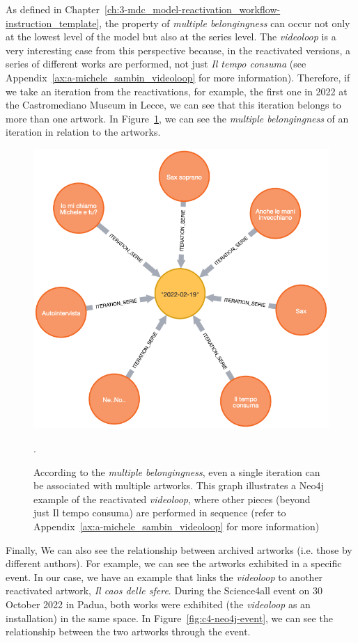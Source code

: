 As defined in Chapter~\ref{ch:3-mdc_model-reactivation_workflow-instruction_template}, the property of \textit{multiple belongingness} can occur not only at the lowest level of the model but also at the series level. The \textit{videoloop} is a very interesting case from this perspective because, in the reactivated versions, a series of different works are performed, not just \textit{Il tempo consuma} (see Appendix~\ref{ax:a-michele_sambin_videoloop} for more information). Therefore, if we take an iteration from the reactivations, for example, the first one in 2022 at the Castromediano Museum in Lecce, we can see that this iteration belongs to more than one artwork. In Figure~\ref{fig:c4-neo4j-multipleartworks}, we can see the \textit{multiple belongingness} of an iteration in relation to the artworks.

\begin{figure}[!h]
    \centering
    \includegraphics[width=0.75\linewidth]{chapters/4-MDC_model_application/image/neo4j-multipleartwork.png}
    \caption{According to the \textit{multiple belongingness}, even a single iteration can be associated with multiple artworks. This graph illustrates a Neo4j example of the reactivated \textit{videoloop}, where other pieces (beyond just Il tempo consuma) are performed in sequence (refer to Appendix~\ref{ax:a-michele_sambin_videoloop} for more information)}.
    \label{fig:c4-neo4j-multipleartworks}
\end{figure}

Finally, We can also see the relationship between archived artworks (i.e. those by different authors). For example, we can see the artworks exhibited in a specific event. In our case, we have an example that links the \textit{videoloop} to another reactivated artwork, \textit{Il caos delle sfere}. During the Science4all event on 30 October 2022 in Padua, both works were exhibited (the \textit{videoloop} as an installation) in the same space. In Figure~\ref{fig:c4-neo4j-event}, we can see the relationship between the two artworks through the event.

